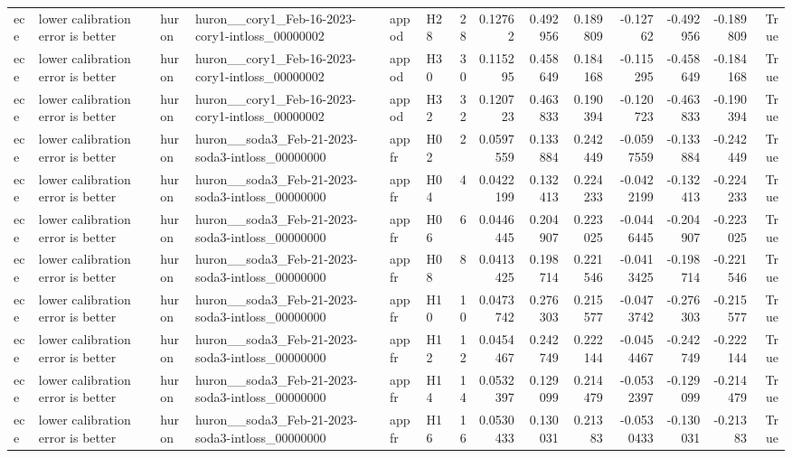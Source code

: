 \begin{longtable}{llllllrrrrrrrr}
ece & lower calibration error is better & huron & huron\_\_cory1\_Feb-16-2023-cory1-intloss\_00000002 & appod & H28 & 28 & 0.12762 & 0.492956 & 0.189809 & -0.12762 & -0.492956 & -0.189809 & True \\
ece & lower calibration error is better & huron & huron\_\_cory1\_Feb-16-2023-cory1-intloss\_00000002 & appod & H30 & 30 & 0.115295 & 0.458649 & 0.184168 & -0.115295 & -0.458649 & -0.184168 & True \\
ece & lower calibration error is better & huron & huron\_\_cory1\_Feb-16-2023-cory1-intloss\_00000002 & appod & H32 & 32 & 0.120723 & 0.463833 & 0.190394 & -0.120723 & -0.463833 & -0.190394 & True \\
ece & lower calibration error is better & huron & huron\_\_soda3\_Feb-21-2023-soda3-intloss\_00000000 & appfr & H02 & 2 & 0.0597559 & 0.133884 & 0.242449 & -0.0597559 & -0.133884 & -0.242449 & True \\
ece & lower calibration error is better & huron & huron\_\_soda3\_Feb-21-2023-soda3-intloss\_00000000 & appfr & H04 & 4 & 0.0422199 & 0.132413 & 0.224233 & -0.0422199 & -0.132413 & -0.224233 & True \\
ece & lower calibration error is better & huron & huron\_\_soda3\_Feb-21-2023-soda3-intloss\_00000000 & appfr & H06 & 6 & 0.0446445 & 0.204907 & 0.223025 & -0.0446445 & -0.204907 & -0.223025 & True \\
ece & lower calibration error is better & huron & huron\_\_soda3\_Feb-21-2023-soda3-intloss\_00000000 & appfr & H08 & 8 & 0.0413425 & 0.198714 & 0.221546 & -0.0413425 & -0.198714 & -0.221546 & True \\
ece & lower calibration error is better & huron & huron\_\_soda3\_Feb-21-2023-soda3-intloss\_00000000 & appfr & H10 & 10 & 0.0473742 & 0.276303 & 0.215577 & -0.0473742 & -0.276303 & -0.215577 & True \\
ece & lower calibration error is better & huron & huron\_\_soda3\_Feb-21-2023-soda3-intloss\_00000000 & appfr & H12 & 12 & 0.0454467 & 0.242749 & 0.222144 & -0.0454467 & -0.242749 & -0.222144 & True \\
ece & lower calibration error is better & huron & huron\_\_soda3\_Feb-21-2023-soda3-intloss\_00000000 & appfr & H14 & 14 & 0.0532397 & 0.129099 & 0.214479 & -0.0532397 & -0.129099 & -0.214479 & True \\
ece & lower calibration error is better & huron & huron\_\_soda3\_Feb-21-2023-soda3-intloss\_00000000 & appfr & H16 & 16 & 0.0530433 & 0.130031 & 0.21383 & -0.0530433 & -0.130031 & -0.21383 & True \\

\end{longtable}
